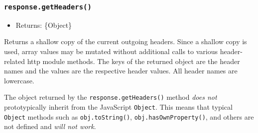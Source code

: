 \begin{Shaded}
\begin{Highlighting}[]
\NormalTok{(}\OperatorTok{,} \NormalTok{)}\OperatorTok{;}
\NormalTok{(}\OperatorTok{,}\NormalTok{ [}\OperatorTok{,} \NormalTok{])}\OperatorTok{;}

\OperatorTok{=}\NormalTok{()}\OperatorTok{;}
\end{Highlighting}
\end{Shaded}

\subsubsection{\texorpdfstring{\texttt{response.getHeaders()}}{response.getHeaders()}}\label{response.getheaders}

\begin{itemize}
\tightlist
\item
  Returns: \{Object\}
\end{itemize}

Returns a shallow copy of the current outgoing headers. Since a shallow
copy is used, array values may be mutated without additional calls to
various header-related http module methods. The keys of the returned
object are the header names and the values are the respective header
values. All header names are lowercase.

The object returned by the \texttt{response.getHeaders()} method
\emph{does not} prototypically inherit from the JavaScript
\texttt{Object}. This means that typical \texttt{Object} methods such as
\texttt{obj.toString()}, \texttt{obj.hasOwnProperty()}, and others are
not defined and \emph{will not work}.

